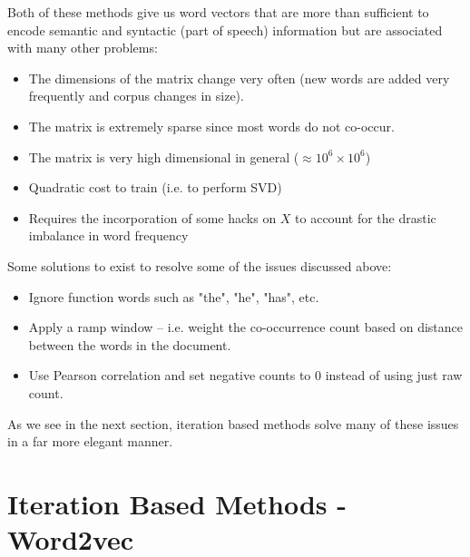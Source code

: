 \documentclass[nobib]{tufte-handout}
\begin{document}
Both of these methods give us word vectors that are more than sufficient to encode semantic and syntactic (part of speech) information but are associated with many other problems:

\begin{itemize}
\item The dimensions of the matrix change very often (new words are added very frequently and corpus changes in size).
\item The matrix is extremely sparse since most words do not co-occur.
\item The matrix is very high dimensional in general ($\approx 10^6 \times 10^6$)
\item Quadratic cost to train (i.e. to perform SVD)
\item Requires the incorporation of some hacks on $X$ to account for the drastic imbalance in word frequency
\end{itemize}
Some solutions to exist to resolve some of the issues discussed above:
\begin{itemize}
\item Ignore function words such as "the", "he", "has", etc.
\item Apply a ramp window -- i.e. weight the co-occurrence count based on distance between the words in the document. 
\item Use Pearson correlation and set negative counts to 0 instead of using just raw count.
\end{itemize}

As we see in the next section, iteration based methods solve many of these issues in a far more elegant manner.

\section{Iteration Based Methods - Word2vec}\label{sec:itermethods}


\end{document}
